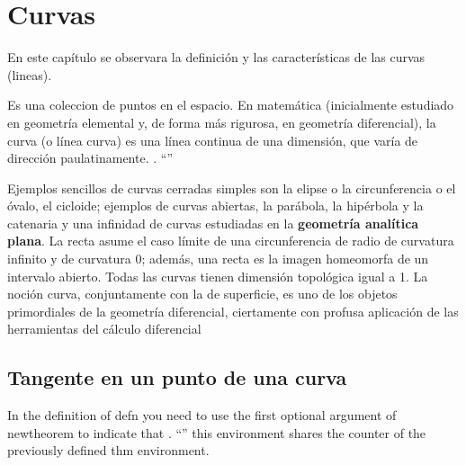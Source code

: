 \chapter{Curvas}
\setcounter{page}{1}






En este capítulo se observara la definición y las características de las curvas (lineas).


\begin{defn}[Curva]
Es una coleccion de puntos en el espacio. En matemática (inicialmente estudiado en geometría elemental y, de forma más rigurosa, en geometría diferencial), la curva (o línea curva) es una línea continua de una dimensión, que varía de dirección paulatinamente. \cite{hilbert2020geometry}. ``''
\end{defn}

Ejemplos sencillos de curvas cerradas simples son la elipse o la circunferencia o el óvalo, el cicloide; ejemplos de curvas abiertas, la parábola, la hipérbola y la catenaria y una infinidad de curvas estudiadas en la \textbf{geometría analítica plana}. La recta asume el caso límite de una circunferencia de radio de curvatura infinito y de curvatura 0; además, una recta es la imagen homeomorfa de un intervalo abierto. Todas las curvas tienen dimensión topológica igual a 1. La noción curva, conjuntamente con la de superficie, es uno de los objetos primordiales de la geometría diferencial, ciertamente con profusa aplicación de las herramientas del cálculo diferencial

\section{Tangente en un punto de una curva}
\begin{defn}[Tangente] In the definition of defn you need to use the first optional argument of  newtheorem to indicate that \cite{hilbert2020geometry}. ``''  this environment shares the counter of the previously defined thm environment.\end{defn}
\cite{reyes} \cite{www}

